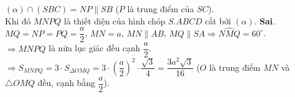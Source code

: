 \begin{ex}
{\begin{itemchoice}
   $\left(\alpha\right)\cap\left(SBC\right)=NP\parallel SB$  ($P$ là trung điểm của $SC$).\\
   Khi đó $MNPQ$ là thiết diện của  hình chóp $S.ABCD$ cắt bởi $\left(\alpha\right)$.
   \itemch  \textbf{Sai}. $MQ=NP=PQ=\dfrac{a}{2}$, $MN=a$, $MN\parallel AB$, $MQ\parallel SA\Rightarrow\widehat{NMQ}=60^\circ$.\\
   $\Rightarrow MNPQ$ là nửa lục giác đều  cạnh $\dfrac{a}{2}$.\\
   $\Rightarrow{S_{MNPQ}}=3\cdot S_{\Delta OMQ}=3\cdot\left(\dfrac{a}{2}\right)^2\cdot\dfrac{\sqrt 3}{4}=\dfrac{3a^2\sqrt 3}{16}$ ($ O $ là trung  điểm $MN$ và $\triangle OMQ$ đều, cạnh bằng $\dfrac{a}{2}$).
  \end{itemchoice}
 } 
\end{ex}

